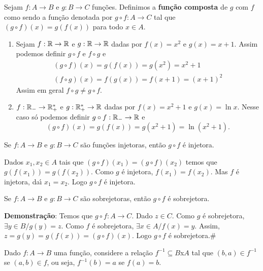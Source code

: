 \begin{definicao}
	Sejam $f : A \to B$ e $g : B \to C$ funções. Definimos a \textbf{função composta} de $g$ com $f$ como sendo a função denotada por $g \circ f : A \to C$ tal que $(g\circ f)(x) = g(f(x))$ para todo $x \in A$.
\end{definicao}

\begin{exemplos}
	\begin{enumerate}
		\item Sejam $f : \mathbb{R} \to \mathbb{R}$ e $g : \mathbb{R} \to \mathbb{R}$ dadas por $f(x) = x^2$ e $g(x) = x + 1$. Assim podemos definir $g \circ f$ e $f \circ g$ e
		\begin{align*}
			(g\circ f)(x) = g(f(x)) = g(x^2) = x^2 + 1\\
			(f\circ g)(x) = f(g(x)) = f(x + 1) = (x + 1)^2
		\end{align*}
		Assim em geral $f \circ g \ne g \circ f$.

		\item $f : \mathbb{R}_- \to \mathbb{R}^*_+$ e $g : \mathbb{R}^*_+ \to \mathbb{R}$ dadas por $f(x) = x^2 + 1$ e $g(x) = \ln x$. Nesse caso só podemos definir $g \circ f : \mathbb{R}_- \to \mathbb{R}$ e
		\[
			(g\circ f)(x) = g(f(x)) = g(x^2 + 1) = \ln(x^2 + 1).
		\]
	\end{enumerate}
\end{exemplos}

\begin{proposicao}
	Se $f : A \to B$ e $g:B \to C$ s{\~a}o fun{\c c}{\~o}es injetoras, ent{\~a}o $g\circ f$ {\'e} injetora.
\end{proposicao}
\begin{prova}
	Dados $x_{1},x_{2}\in A$ tais que $(g\circ f)(x_{1})=(g\circ f)(x_{2})$ temos que $g(f(x_{1}))=g(f(x_{2}))$. Como $g$ {\'e} injetora, $f(x_{1})=f(x_{2})$. Mas $f$ {\'e} injetora, da{\'\i} $x_{1}=x_{2}$. Logo $g\circ f$ {\'e} injetora.	
\end{prova}

\begin{proposicao} Se $f:A \to B$ e $g:B \to C$ s{\~a}o sobrejetoras, ent{\~a}o $g\circ f$ {\'e} sobrejetora.\end{proposicao}

\textbf{Demonstra{\c c}{\~a}o}: Temos que $g\circ f:A \to C$. Dado $z\in C$. Como $g$ {\'e} sobrejetora, $\exists y\in B/g(y)=z$. Como $f$ {\'e} sobrejetora, $\exists x\in A/f(x)=y$. Assim, $z=g(y)=g(f(x))=(g\circ f)(x)$. Logo $g\circ f$ {\'e} sobrejetora.\#

Dado $f:A \to B$ uma funç{\~a}o, considere a relaç{\~a}o $f^{-1}\subseteq B$x$A$ tal que $(b,a)\in f^{-1}$ se $(a,b)\in f$, ou seja, $f^{-1}(b)=a$ se $f(a)=b$.

